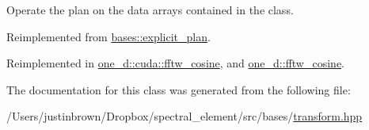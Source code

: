  Operate the plan on the data arrays contained in the class. 

Reimplemented from \hyperlink{classbases_1_1explicit__plan_a21bcba4d429590031bba41ee2a48a4ef}{bases\-::explicit\-\_\-plan}.



Reimplemented in \hyperlink{classone__d_1_1cuda_1_1fftw__cosine_a557fc154a9e6ffe9a8179667b66901dc}{one\-\_\-d\-::cuda\-::fftw\-\_\-cosine}, and \hyperlink{classone__d_1_1fftw__cosine_aa8b0befe7b047feb004b2c41644a2fa4}{one\-\_\-d\-::fftw\-\_\-cosine}.



The documentation for this class was generated from the following file\-:\begin{DoxyCompactItemize}
\item 
/\-Users/justinbrown/\-Dropbox/spectral\-\_\-element/src/bases/\hyperlink{transform_8hpp}{transform.\-hpp}\end{DoxyCompactItemize}
